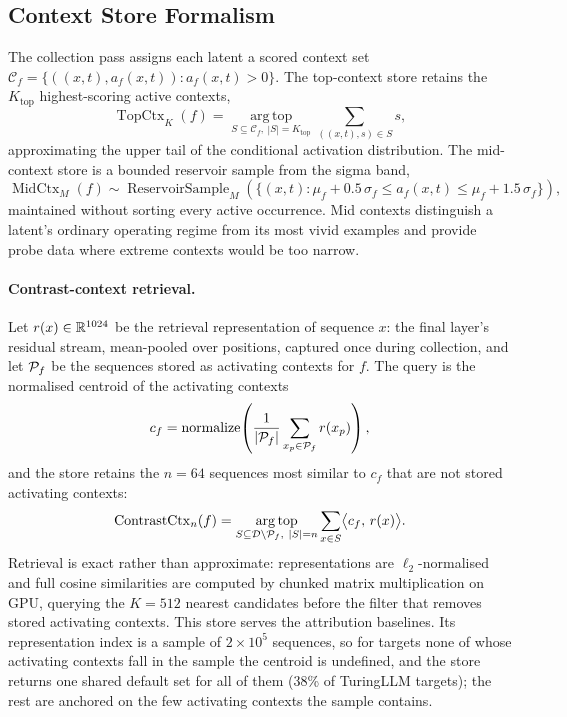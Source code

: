 \documentclass[10pt]{article}
\begin{document}
\subsection{Context Store Formalism}

The collection pass assigns each latent a scored context set
$\mathcal{C}_f = \{((x,t), a_f(x,t)) : a_f(x,t) > 0\}$.
The top-context store retains the $K_{\mathrm{top}}$ highest-scoring active contexts,
\[
    \operatorname{TopCtx}_K(f)
    =
    \operatorname*{arg\,top}_{S \subseteq \mathcal{C}_f,\ |S|=K_{\mathrm{top}}}
    \sum_{((x,t),s)\in S} s,
\]
approximating the upper tail of the conditional activation distribution.
The mid-context store is a bounded reservoir sample from the sigma band,
\[
    \operatorname{MidCtx}_M(f)
    \sim
    \operatorname{ReservoirSample}_M\!\left(
    \{(x,t) : \mu_f + 0.5\,\sigma_f \leq a_f(x,t) \leq \mu_f + 1.5\,\sigma_f\}
    \right),
\]
maintained without sorting every active occurrence.
Mid contexts distinguish a latent's ordinary operating regime from its most vivid examples and provide probe data where extreme contexts would be too narrow.

\paragraph{Contrast-context retrieval.}
Let $r(x) \in \mathbb{R}^{1024}$ be the retrieval representation of sequence $x$: the final layer's residual stream, mean-pooled over positions, captured once during collection, and let $\mathcal{P}_f$ be the sequences stored as activating contexts for $f$.
The query is the normalised centroid of the activating contexts
\[
    c_f = \operatorname{normalize}\!\left(
    \frac{1}{|\mathcal{P}_f|} \sum_{x_p \in \mathcal{P}_f} r(x_p)
    \right),
\]
and the store retains the $n = 64$ sequences most similar to $c_f$ that are not stored activating contexts:
\[
    \operatorname{ContrastCtx}_n(f)
    =
    \operatorname*{arg\,top}_{S \subseteq \mathcal{D} \setminus \mathcal{P}_f,\ |S|=n}
    \sum_{x \in S} \bigl\langle c_f,\, r(x) \bigr\rangle .
\]
Retrieval is exact rather than approximate: representations are $\ell_2$-normalised and full cosine similarities are computed by chunked matrix multiplication on GPU, querying the $K = 512$ nearest candidates before the filter that removes stored activating contexts.
This store serves the attribution baselines.
Its representation index is a sample of $2 \times 10^{5}$ sequences, so for targets none of whose activating contexts fall in the sample the centroid is undefined, and the store returns one shared default set for all of them (38\% of TuringLLM targets); the rest are anchored on the few activating contexts the sample contains.
\end{document}
